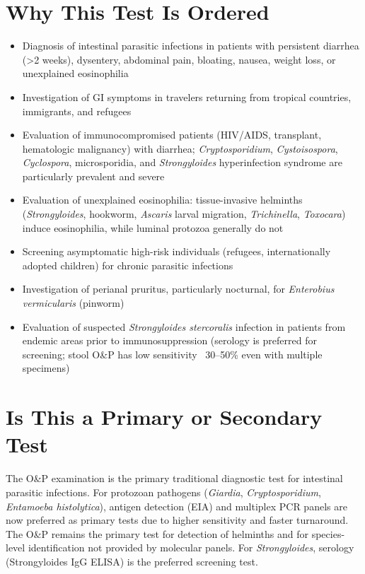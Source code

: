 \section*{Why This Test Is Ordered}
\begin{itemize}
  \item Diagnosis of intestinal parasitic infections in patients with persistent diarrhea (>2 weeks), dysentery, abdominal pain, bloating, nausea, weight loss, or unexplained eosinophilia
  \item Investigation of GI symptoms in travelers returning from tropical countries, immigrants, and refugees
  \item Evaluation of immunocompromised patients (HIV/AIDS, transplant, hematologic malignancy) with diarrhea; \textit{Cryptosporidium}, \textit{Cystoisospora}, \textit{Cyclospora}, microsporidia, and \textit{Strongyloides} hyperinfection syndrome are particularly prevalent and severe
  \item Evaluation of unexplained eosinophilia: tissue-invasive helminths (\textit{Strongyloides}, hookworm, \textit{Ascaris} larval migration, \textit{Trichinella}, \textit{Toxocara}) induce eosinophilia, while luminal protozoa generally do not
  \item Screening asymptomatic high-risk individuals (refugees, internationally adopted children) for chronic parasitic infections
  \item Investigation of perianal pruritus, particularly nocturnal, for \textit{Enterobius vermicularis} (pinworm)
  \item Evaluation of suspected \textit{Strongyloides stercoralis} infection in patients from endemic areas prior to immunosuppression (serology is preferred for screening; stool O\&P has low sensitivity ~30--50\% even with multiple specimens)
\end{itemize}

\section*{Is This a Primary or Secondary Test}
The O\&P examination is the primary traditional diagnostic test for intestinal parasitic infections. For protozoan pathogens (\textit{Giardia}, \textit{Cryptosporidium}, \textit{Entamoeba histolytica}), antigen detection (EIA) and multiplex PCR panels are now preferred as primary tests due to higher sensitivity and faster turnaround. The O\&P remains the primary test for detection of helminths and for species-level identification not provided by molecular panels. For \textit{Strongyloides}, serology (Strongyloides IgG ELISA) is the preferred screening test.

